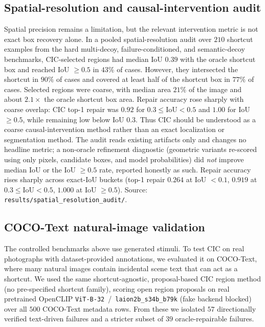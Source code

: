 \documentclass[11pt]{article}
\begin{document}
\subsection{Spatial-resolution and causal-intervention audit}\label{sec:spatial}
Spatial precision remains a limitation, but the relevant intervention metric is not
exact box recovery alone. In a pooled spatial-resolution audit over $210$ shortcut
examples from the hard multi-decoy, failure-conditioned, and semantic-decoy
benchmarks, CIC-selected regions had median IoU $0.39$ with the oracle shortcut box
and reached IoU $\ge 0.5$ in $43\%$ of cases. However, they intersected the shortcut
in $90\%$ of cases and covered at least half of the shortcut box in $77\%$ of cases.
Selected regions were coarse, with median area $21\%$ of the image and about
$2.1\times$ the oracle shortcut box area. Repair accuracy rose sharply with coarse
overlap: CIC top-1 repair was $0.92$ for $0.3 \le \text{IoU} < 0.5$ and $1.00$ for
IoU $\ge 0.5$, while remaining low below IoU $0.3$. Thus CIC should be understood as a
coarse causal-intervention method rather than an exact localization or segmentation
method. The audit reads existing artifacts only and changes no headline metric; a
non-oracle refinement diagnostic (geometric variants re-scored using only pixels,
candidate boxes, and model probabilities) did \emph{not} improve median IoU or the
IoU $\ge 0.5$ rate, reported honestly as such. Repair accuracy rises sharply across
exact-IoU buckets (top-1 repair $0.264$ at IoU $<0.1$, $0.919$ at $0.3\le$IoU$<0.5$,
$1.000$ at IoU $\ge0.5$). Source:
\texttt{results/spatial\_resolution\_audit/}.

\subsection{COCO-Text natural-image validation}\label{sec:cocotext}
The controlled benchmarks above use generated stimuli. To test CIC on real
photographs with dataset-provided annotations, we evaluated it on COCO-Text, where
many natural images contain incidental scene text that can act as a shortcut. We
used the same shortcut-agnostic, proposal-based CIC region method (no pre-specified
shortcut family), scoring open region proposals on real pretrained OpenCLIP
\texttt{ViT-B-32}~/~\texttt{laion2b\_s34b\_b79k} (fake backend blocked) over all
$500$ COCO-Text metadata rows. From these we isolated $57$ directionally verified
text-driven failures and a stricter subset of $39$ oracle-repairable failures.
\end{document}
